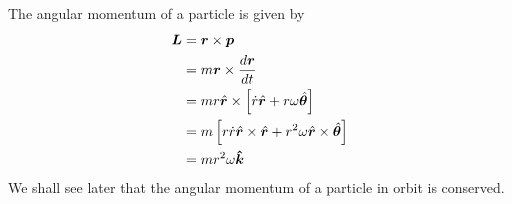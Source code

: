 The angular momentum of a particle is given by
\begin{align}
\bm{L}&=\bm{r} \times \bm{p} \nonumber \\
&=m \bm{r}\times \frac{d \bm{r}}{d t} \nonumber \\
&=m r \hat{\bm{r}} \times \left[ \dot{r} \hat{\bm{r}} + r \omega \hat{\bm{\theta}} \right] \nonumber \\
&=m \left[ r \dot{r}\hat{\bm{r}} \times \hat{\bm{r}} + r^2 \omega \hat{\bm{r}} \times\hat{\bm{\theta}} \right] \nonumber \\
&=m r^2 \omega {\bm{\hat{\bm{k}}}} \label{eq:AngularMomentumInTermsOfrandomega}
\end{align}
We shall see later that the angular momentum of a particle in orbit is conserved.